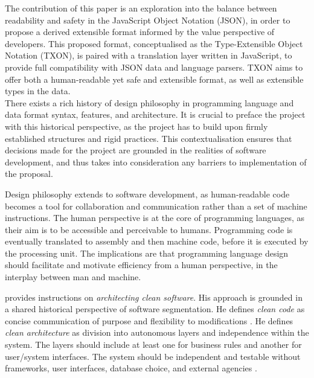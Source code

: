 \documentclass[../report.tex]{subfiles}
\begin{document}
The contribution of this paper is an exploration into the balance between readability and safety in the JavaScript Object Notation (JSON), in order to propose a derived extensible format informed by the value perspective of developers. This proposed format, conceptualised as the Type-Extensible Object Notation (TXON), is paired with a translation layer written in JavaScript, to provide full compatibility with JSON data and language parsers. TXON aims to offer both a human-readable yet safe and extensible format, as well as extensible types in the data. \\


There exists a rich history of design philosophy in programming language and data format syntax, features, and architecture. It is crucial to preface the project with this historical perspective, as the project has to build upon firmly established structures and rigid practices. This contextualisation ensures that decisions made for the project are grounded in the realities of software development, and thus takes into consideration any barriers to implementation of the proposal.

Design philosophy extends to software development, as human-readable code becomes a tool for collaboration and communication rather than a set of machine instructions. The human perspective is at the core of programming languages, as their aim is to be accessible and perceivable to humans. Programming code is eventually translated to assembly and then machine code, before it is executed by the processing unit. The implications are that programming language design should facilitate and motivate efficiency from a human perspective, in the interplay between man and machine.

\cite{martin2018clean} provides instructions on \textit{architecting clean software}. His approach is grounded in a shared historical perspective of software segmentation. He defines \textit{clean code} as concise communication of purpose and flexibility to modifications \cite[p. 310]{martin2018clean}. He defines \textit{clean architecture} as division into autonomous layers and independence within the system. The layers should include at least one for business rules and another for user/system interfaces. The system should be independent and testable without frameworks, user interfaces, database choice, and external agencies \cite[p. 196]{martin2018clean}. \\
\end{document}
